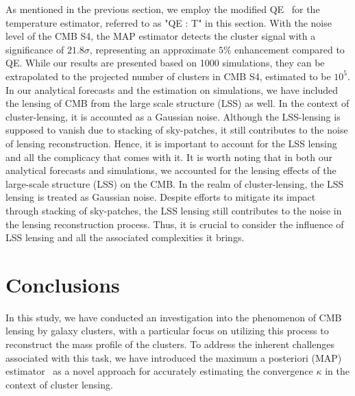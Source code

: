 \documentclass[prd, superscriptaddress, tightenlines, longbibliography, nofootinbib, eqsecnum, amsfonts, amsmath, floatfix, twocolumn, notitlepage]{revtex4-2}
\begin{document}
As mentioned in the previous section, we employ the modified QE~\cite{Hu:2007bt} for the temperature estimator, referred to as "QE : T" in this section. With the noise level of the CMB S4, the MAP estimator detects the cluster signal with a significance of $21.8\sigma$, representing an approximate $5\%$ enhancement compared to QE. While our results are presented based on 1000 simulations, they can be extrapolated to the projected number of clusters in CMB S4, estimated to be $10^5$. In our analytical forecasts and the estimation on simulations, we have included the lensing of CMB from the large scale structure (LSS) as well. In the context of cluster-lensing, it is accounted as a Gaussian noise. Although the LSS-lensing is supposed to vanish due to stacking of sky-patches, it still contributes to the noise of lensing reconstruction. Hence, it is important to account for the LSS lensing and all the complicacy that comes with it. It is worth noting that in both our analytical forecasts and simulations, we accounted for the lensing effects of the large-scale structure (LSS) on the CMB. In the realm of cluster-lensing, the LSS lensing is treated as Gaussian noise. Despite efforts to mitigate its impact through stacking of sky-patches, the LSS lensing still contributes to the noise in the lensing reconstruction process. Thus, it is crucial to consider the influence of LSS lensing and all the associated complexities it brings.


\section{Conclusions}
\label{sec:conclusion}

In this study, we have conducted an investigation into the phenomenon of CMB lensing by galaxy clusters, with a particular focus on utilizing this process to reconstruct the mass profile of the clusters. To address the inherent challenges associated with this task, we have introduced the maximum a posteriori (MAP) estimator~\cite{Carron:2017mqf} as a novel approach for accurately estimating the convergence $\kappa$ in the context of cluster lensing.
\end{document}
